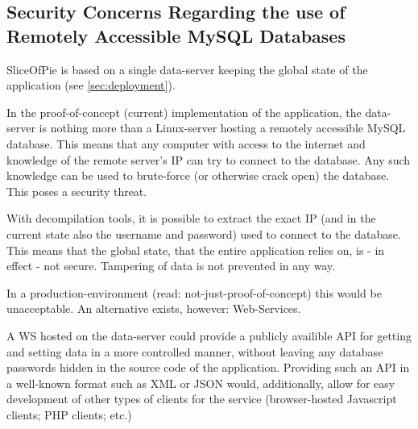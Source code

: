 \subsection{Security Concerns Regarding the use of Remotely Accessible MySQL Databases}
\label{sec:mysqlvswebservice}

SliceOfPie is based on a single data-server keeping the global state of the application (see \ref{sec:deployment}).

In the proof-of-concept (current) implementation of the application, the data-server is nothing more than a Linux-server
hosting a remotely accessible MySQL database. This means that any computer with access to the internet and knowledge of
the remote server's IP can try to connect to the database. Any such knowledge can be used to brute-force (or otherwise
crack open) the database. This poses a security threat.

With decompilation tools, it is possible to extract the exact IP (and in the current state also the username and password)
used to connect to the database. This means that the global state, that the entire application relies on, is - in effect -
not secure. Tampering of data is not prevented in any way.

In a production-environment (read: not-just-proof-of-concept) this would be unacceptable. An alternative exists, however:
Web-Services.

A WS hosted on the data-server could provide a publicly availible API for getting and setting data in a more controlled manner,
without leaving any database passwords hidden in the source code of the application. Providing such an API in a well-known format
such as XML or JSON\cite{ibmREST} would, additionally, allow for easy development of other types of clients for the service (browser-hosted
Javascript clients; PHP clients; etc.)